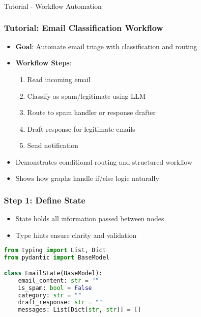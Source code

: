 \begin{frame}[fragile]\frametitle{}
\begin{center}
{\Large Tutorial - Workflow Automation}
\end{center}
\end{frame}

\begin{frame}[fragile]\frametitle{Tutorial: Email Classification Workflow}
      \begin{itemize}
        \item \textbf{Goal}: Automate email triage with classification and routing
        \item \textbf{Workflow Steps}:
        \begin{enumerate}
            \item Read incoming email
            \item Classify as spam/legitimate using LLM
            \item Route to spam handler or response drafter
            \item Draft response for legitimate emails
            \item Send notification
        \end{enumerate}
        \item Demonstrates conditional routing and structured workflow
        \item Shows how graphs handle if/else logic naturally
      \end{itemize}
\end{frame}

\begin{frame}[fragile]\frametitle{Step 1: Define State}

      \begin{itemize}
        \item State holds all information passed between nodes
        \item Type hints ensure clarity and validation
      \end{itemize}
	  
	  
      \begin{lstlisting}[language=Python, basicstyle=\small]
from typing import List, Dict
from pydantic import BaseModel

class EmailState(BaseModel):
    email_content: str = ""
    is_spam: bool = False
    category: str = ""
    draft_response: str = ""
    messages: List[Dict[str, str]] = []
      \end{lstlisting}
      

\end{frame}


